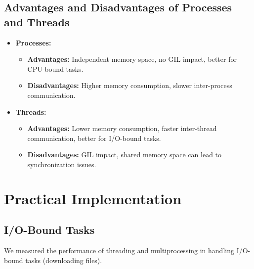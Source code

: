 \documentclass[onecolumn]{article}
\begin{document}
\subsection{Advantages and Disadvantages of Processes and Threads}
\begin{itemize}
    \item \textbf{Processes:}
    \begin{itemize}
        \item \textbf{Advantages:} Independent memory space, no GIL impact, better for CPU-bound tasks.
        \item \textbf{Disadvantages:} Higher memory consumption, slower inter-process communication.
    \end{itemize}
    \item \textbf{Threads:}
    \begin{itemize}
        \item \textbf{Advantages:} Lower memory consumption, faster inter-thread communication, better for I/O-bound tasks.
        \item \textbf{Disadvantages:} GIL impact, shared memory space can lead to synchronization issues.
    \end{itemize}
\end{itemize}

\section{Practical Implementation}
\subsection{I/O-Bound Tasks}
We measured the performance of threading and multiprocessing in handling I/O-bound tasks (downloading files).
\end{document}
